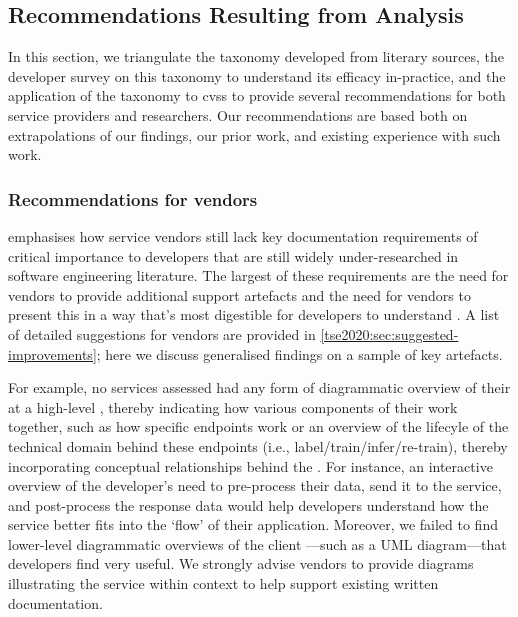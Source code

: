 \subsection{Recommendations Resulting from Analysis}
\label{tse2020:sec:tax-analysis:cvs-improvement}

In this section, we triangulate the taxonomy developed from literary sources, the developer survey on this taxonomy to understand its efficacy in-practice, and the application of the taxonomy to \glspl{cvs} to provide several recommendations for both service providers and researchers. Our recommendations are based both on extrapolations of our findings, our prior work, and existing experience with such work.

\subsubsection{Recommendations for vendors}

 emphasises how service vendors still lack key documentation requirements of critical importance to developers that are still widely under-researched in software engineering literature. The largest of these requirements are the need for vendors to provide additional support artefacts  and the need for vendors to present this in a way that's most digestible for developers to understand . A list of detailed suggestions for vendors are provided in \cref{tse2020:sec:suggested-improvements}; here we discuss generalised findings on a sample of key artefacts.

For example, no services assessed had any form of diagrammatic overview of their  at a high-level , thereby indicating how various components of their  work together, such as how specific endpoints work or an overview of the lifecyle of the technical domain behind these endpoints (i.e., label/train/infer/re-train), thereby incorporating conceptual relationships behind the  . For instance, an interactive overview of the developer's need to pre-process their data, send it to the service, and post-process the response data would help developers understand how the service better fits into the `flow' of their application. Moreover, we failed to find lower-level diagrammatic overviews of the client ---such as a UML diagram---that developers find very useful. We strongly advise vendors to provide diagrams illustrating the service within context to help support existing written documentation.


